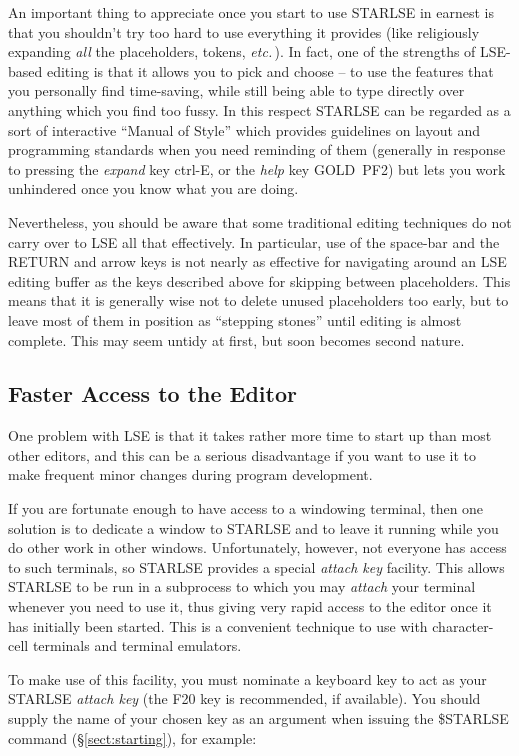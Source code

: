 An important thing to appreciate once you start to use \mbox{STARLSE} in
earnest is that you shouldn't try too hard to use everything it provides
(like religiously expanding {\em all} the placeholders, tokens, {\em
etc.}\,).
In fact, one of the strengths of \mbox{LSE}-based editing is that it allows
you to pick and choose -- to use the features that you personally find
time-saving, while still being able to type directly over anything which you
find too fussy.
In this respect \mbox{STARLSE} can be regarded as a sort of interactive
``Manual of Style'' which provides guidelines on layout and programming
standards when you need reminding of them (generally in response to pressing
the {\em expand} key \mbox{ctrl-E}, or the {\em help} key
\mbox{GOLD}~\mbox{PF2}) but lets you work unhindered once you know what you
are doing.

Nevertheless, you should be aware that some traditional editing techniques
do not carry over to LSE all that effectively.
In particular, use of the space-bar and the RETURN and arrow keys is not
nearly as effective for navigating around an LSE editing buffer as the keys
described above for skipping between placeholders.
This means that it is generally wise not to delete unused placeholders too
early, but to leave most of them in position as ``stepping stones'' until
editing is almost complete.
This may seem untidy at first, but soon becomes second nature.


\subsection{Faster Access to the Editor}
\label{sect:attaching}
One problem with LSE is that it takes rather more time to start up than most
other editors, and this can be a serious disadvantage if you want to use it to
make frequent minor changes during program development.

If you are fortunate enough to have access to a windowing terminal, then one
solution is to dedicate a window to STARLSE and to leave it running while you do
other work in other windows. Unfortunately, however, not everyone has access to
such terminals, so STARLSE provides a special {\em attach key} facility. This
allows STARLSE to be run in a subprocess to which you may {\em attach} your
terminal whenever you need to use it, thus giving very rapid access to the
editor once it has initially been started. This is a convenient technique to use
with character-cell terminals and terminal emulators.

To make use of this facility, you must nominate a keyboard key to act as your
STARLSE {\em attach key} (the F20 key is recommended, if available). You should
supply the name of your chosen key as an argument when issuing the \$STARLSE
command (\S\ref{sect:starting}), for example:

